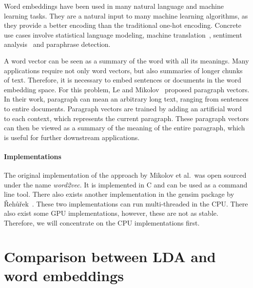 \documentclass[
        a4paper,
        titlepage,
        twoside,
        parskip
        ]{scrbook}
\theoremstyle{break}
\begin{document}
Word embeddings have been used in many natural language and machine learning tasks.
They are a natural input to many machine learning algorithms, as they provide a better encoding than the traditional one-hot encoding.
Concrete use cases involve statistical language modeling, machine translation~\cite{Zou2013}, sentiment analysis~\cite{Maas2011} and paraphrase detection.

A word vector can be seen as a summary of the word with all its meanings.
Many applications require not only word vectors, but also summaries of longer chunks of text.
Therefore, it is necessary to embed sentences or documents in the word embedding space.
For this problem, Le and Mikolov~\cite{Le2014} proposed paragraph vectors.
In their work, paragraph can mean an arbitrary long text, ranging from sentences to entire documents.
Paragraph vectors are trained by adding an artificial word to each context, which represents the current paragraph.
These paragraph vectors can then be viewed as a summary of the meaning of the entire paragraph, which is useful for further downstream applications.

\paragraph{Implementations}
The original implementation of the approach by Mikolov et al.~was open sourced under the name \emph{word2vec}.
It is implemented in C and can be used as a command line tool.
There also exists another implementation in the gensim package by {\v R}eh{\r u}{\v r}ek~\cite{Rehurek2010}.
These two implementations can run multi-threaded in the CPU.
There also exist some GPU implementations, however, these are not as stable.
Therefore, we will concentrate on the CPU implementations first.

\section{Comparison between LDA and word embeddings}

\end{document}
